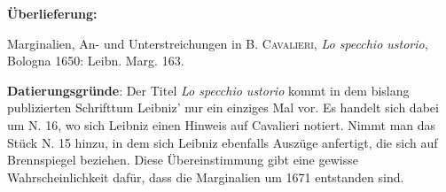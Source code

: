       
               
                \begin{ledgroupsized}[r]{120mm}
                \footnotesize 
                \pstart                
                \noindent\textbf{\"{U}berlieferung:}   
                \pend
                \end{ledgroupsized}
            
              
                            \begin{ledgroupsized}[r]{114mm}
                            \footnotesize 
                            \pstart \parindent -6mm
                            Marginalien, An- und Unterstreichungen in \textsc{B. Cavalieri}, \cite{00021}\textit{Lo specchio ustorio}, Bologna 1650: Leibn. Marg. 163. \pend
                            \end{ledgroupsized}
                \vspace*{5mm}
                \begin{ledgroup}
                \footnotesize 
                \pstart
            \noindent\footnotesize{\textbf{Datierungsgr\"{u}nde}: Der Titel \cite{00021}\textit{Lo specchio ustorio} kommt in dem bislang publizierten Schrifttum Leibniz' nur ein einziges Mal vor. Es handelt sich dabei um N. 16, wo sich Leibniz einen Hinweis auf Cavalieri\protect{} notiert. Nimmt man das St\"{u}ck N. 15 hinzu, in dem sich Leibniz ebenfalls Ausz\"{u}ge anfertigt, die sich auf Brennspiegel beziehen. Diese \"{U}bereinstimmung gibt eine gewisse Wahrscheinlichkeit daf\"{u}r, dass die Marginalien um 1671 entstanden sind.}
                \pend
                \end{ledgroup}
            
